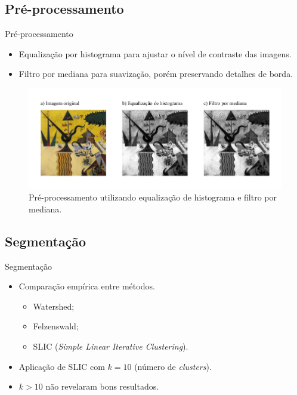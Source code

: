 \documentclass{beamer}
\begin{document}
\subsection{Pré-processamento}
\begin{frame}{Pré-processamento}

 \begin{itemize}
    \item<1> Equalização por histograma para ajustar o nível de contraste das imagens.

    \item<2> Filtro por mediana para suavização, porém preservando detalhes de borda.
  \end{itemize}

\begin{figure}[h!]
\begin{center}
  \includegraphics[width=.9\textwidth]{figs/passos_eq}
         \caption{Pré-processamento utilizando equalização de histograma
        e filtro por mediana.}
        \label{fig:eq}
\end{center}
\end{figure}

\end{frame}

\subsection{Segmentação}
\begin{frame}{Segmentação}
  \begin{itemize}
    \item{ Comparação empírica entre métodos.
      \begin{itemize}
        \item Watershed;
        \item Felzenswald;
        \item SLIC (\textit{Simple Linear Iterative Clustering}).%
      \end{itemize}
    }
    \pause
    \item Aplicação de SLIC com $k=10$ (número de \textit{clusters}).
    \pause
    \item $k>10$ não revelaram bons resultados.
  \end{itemize}

\end{frame}
\end{document}

